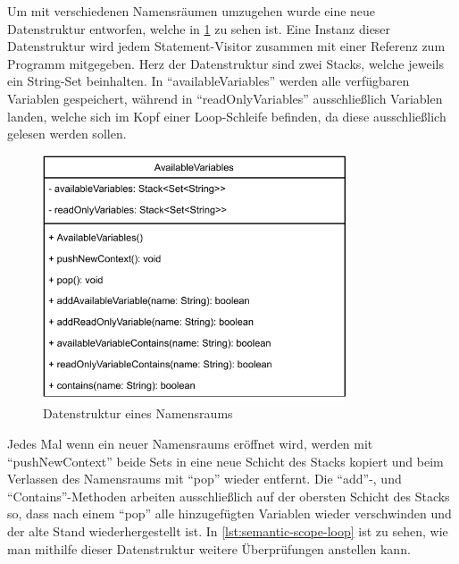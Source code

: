 Um mit verschiedenen Namensräumen umzugehen wurde eine neue Datenstruktur entworfen, welche in \cref{pic:Semantic-Scope} zu sehen ist. Eine Instanz dieser Datenstruktur wird jedem Statement-Visitor zusammen mit einer Referenz zum Programm mitgegeben. Herz der Datenstruktur sind zwei Stacks, welche jeweils ein String-Set beinhalten. In \enquote{availableVariables} werden alle verfügbaren Variablen gespeichert, während in \enquote{readOnlyVariables} ausschließlich Variablen landen, welche sich im Kopf einer Loop-Schleife befinden, da diese ausschließlich gelesen werden sollen.

\begin{figure}[h!]
	\centering
	\includegraphics[width=9cm]{content/pictures/AvailableVar.pdf}
	\caption{Datenstruktur eines Namensraums}
	\label{pic:Semantic-Scope}
\end{figure}

Jedes Mal wenn ein neuer Namensraums eröffnet wird, werden mit \enquote{pushNewContext} beide Sets in eine neue Schicht des Stacks kopiert und beim Verlassen des Namensraums mit \enquote{pop} wieder entfernt. Die \enquote{add}-, und \enquote{Contains}-Methoden arbeiten ausschließlich auf der obersten Schicht des Stacks so, dass nach einem \enquote{pop} alle hinzugefügten Variablen wieder verschwinden und der alte Stand wiederhergestellt ist. In \cref{lst:semantic-scope-loop} ist zu sehen, wie man mithilfe dieser Datenstruktur weitere Überprüfungen anstellen kann. 

